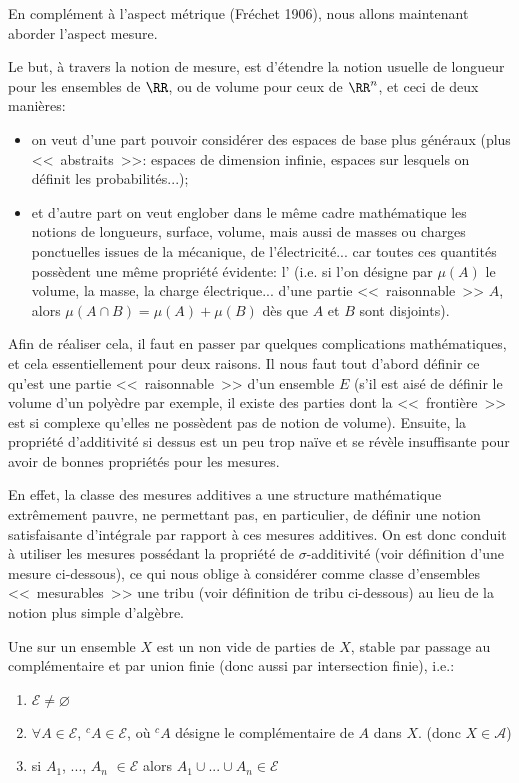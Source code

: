 En complément à l'aspect métrique (Fréchet 1906), nous
allons maintenant aborder l'aspect mesure.

\medskip
Le but, à travers la notion de mesure, est d'étendre la notion usuelle de longueur pour les ensembles
de $\RR$, ou de volume pour ceux de $\RR^n$, et ceci de deux manières:
\begin{itemize}
\item on veut d'une part pouvoir considérer des espaces de base plus généraux (plus <<~abstraits~>>:
espaces de dimension infinie, espaces sur lesquels on définit les probabilités...); 
\item et
d'autre part on veut englober dans le même cadre mathématique les notions de longueurs, 
surface, volume, mais aussi de masses ou charges ponctuelles issues de la mécanique, de
l'électricité... car toutes ces quantités possèdent une même propriété évidente: l'
(i.e. si l'on désigne par $\mu(A)$ le volume, la masse, la charge électrique... d'une partie <<~raisonnable~>> $A$,
alors $\mu(A\cap B)=\mu(A)+\mu(B)$ dès que $A$ et $B$ sont disjoints).
\end{itemize}

\medskip
Afin de réaliser cela, il faut en passer par quelques complications mathématiques, et cela essentiellement
pour deux raisons.
Il nous faut tout d'abord définir ce qu'est une partie <<~raisonnable~>> d'un ensemble $E$ (s'il est
aisé de définir le volume d'un polyèdre par exemple, il existe des parties dont la <<~frontière~>> est
si complexe qu'elles ne possèdent pas de notion de volume).
Ensuite, la propriété d'additivité si dessus est un peu trop naïve et se révèle insuffisante pour avoir de bonnes 
propriétés pour les mesures.

En effet, la classe des mesures additives a une structure mathématique extrêmement pauvre, ne permettant pas, 
en particulier, de définir une notion satisfaisante d'intégrale par rapport à ces mesures additives.
On est donc conduit à utiliser les mesures possédant la propriété de $\sigma$-additivité (voir définition
d'une mesure ci-dessous), ce qui nous oblige à  considérer comme classe d'ensembles <<~mesurables~>> une 
tribu (voir définition de tribu ci-dessous) au lieu de la notion plus simple d'algèbre.

\medskip
\begin{definition}[Algèbre]
Une  sur un ensemble 
$X$ est un  non vide de parties de $X$,  stable par passage au complémentaire et par union finie
(donc aussi par intersection finie), i.e.:
\begin{enumerate}
 \item $\mathcal{E} \not=\varnothing$
 \item $\forall A \in \mathcal{E}$, ${}^c A \in\mathcal{E}$, où ${}^cA$ désigne le complémentaire de $A$ dans $X$.
	(donc $X\in \mathcal{A}$)
\item si $A_1$, ..., $A_n$ $\in\mathcal{E}$ alors $A_1\cup ...\cup A_n \in\mathcal{E}$
\end{enumerate}
\end{definition}

